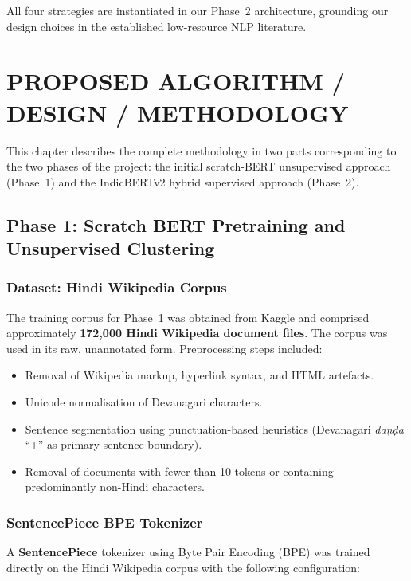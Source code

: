 \documentclass[12pt,a4paper]{report}
\begin{document}
All four strategies are instantiated in our Phase~2 architecture, grounding our design choices in the established low-resource NLP literature.


\chapter{PROPOSED ALGORITHM / DESIGN / METHODOLOGY}

This chapter describes the complete methodology in two parts corresponding to the two phases of the project: the initial scratch-BERT unsupervised approach (Phase~1) and the IndicBERTv2 hybrid supervised approach (Phase~2).

\section{Phase 1: Scratch BERT Pretraining and Unsupervised Clustering}

\subsection{Dataset: Hindi Wikipedia Corpus}

The training corpus for Phase~1 was obtained from Kaggle and comprised approximately \textbf{172,000 Hindi Wikipedia document files}. The corpus was used in its raw, unannotated form. Preprocessing steps included:

\begin{itemize}
    \item Removal of Wikipedia markup, hyperlink syntax, and HTML artefacts.
    \item Unicode normalisation of Devanagari characters.
    \item Sentence segmentation using punctuation-based heuristics (Devanagari \textit{daṇḍa} ``।'' as primary sentence boundary).
    \item Removal of documents with fewer than 10 tokens or containing predominantly non-Hindi characters.
\end{itemize}

\subsection{SentencePiece BPE Tokenizer}

A \textbf{SentencePiece} tokenizer using Byte Pair Encoding (BPE) was trained directly on the Hindi Wikipedia corpus with the following configuration:
\end{document}
